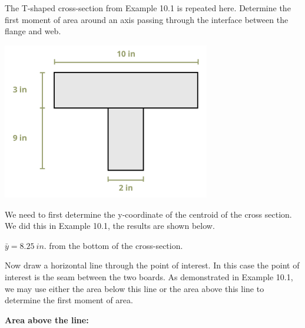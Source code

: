 \documentclass[
  letterpaper,
  DIV=11,
  numbers=noendperiod]{scrreprt}
\theoremstyle{definition}
\theoremstyle{remark}
\begin{document}
\begin{tcolorbox}[enhanced jigsaw, leftrule=.75mm, colbacktitle=quarto-callout-tip-color!10!white, breakable, opacityback=0, colback=white, titlerule=0mm, toprule=.15mm, colframe=quarto-callout-tip-color-frame, coltitle=black, title={Example 10.2}, toptitle=1mm, bottomrule=.15mm, rightrule=.15mm, left=2mm, arc=.35mm, opacitybacktitle=0.6, bottomtitle=1mm]

The T-shaped cross-section from Example 10.1 is repeated here. Determine
the first moment of area around an axis passing through the interface
between the flange and web.

\begin{center}
\includegraphics[width=3.57292in,height=\textheight]{images/CH10 PNGs/example 10.2 part 1.png}
\end{center}

\begin{tcolorbox}[enhanced jigsaw, leftrule=.75mm, colbacktitle=quarto-callout-tip-color!10!white, breakable, opacityback=0, colback=white, titlerule=0mm, toprule=.15mm, colframe=quarto-callout-tip-color-frame, coltitle=black, title={Solution}, toptitle=1mm, bottomrule=.15mm, rightrule=.15mm, left=2mm, arc=.35mm, opacitybacktitle=0.6, bottomtitle=1mm]

We need to first determine the y-coordinate of the centroid of the cross
section. We did this in Example 10.1, the results are shown below.

\(\bar{y}=8.25{~in.}\) from the bottom of the cross-section.

Now draw a horizontal line through the point of interest. In this case
the point of interest is the seam between the two boards. As
demonstrated in Example 10.1, we may use either the area below this line
or the area above this line to determine the first moment of area.

\textbf{Area above the line:}


\end{tcolorbox}
\end{tcolorbox}
\end{document}
